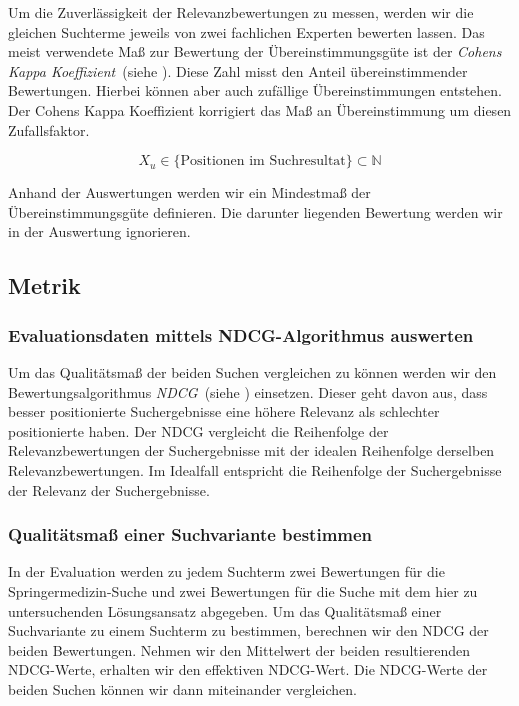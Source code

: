 Um die Zuverlässigkeit der Relevanzbewertungen zu messen, werden wir die gleichen Suchterme jeweils von zwei fachlichen Experten bewerten lassen. Das  meist verwendete  Maß  zur  Bewertung  der Übereinstimmungsgüte ist der \textit{Cohens Kappa Koeffizient}~(siehe \cite{Kappa}). Diese Zahl misst den  Anteil übereinstimmender Bewertungen. Hierbei können aber auch zufällige Übereinstimmungen entstehen. Der Cohens Kappa Koeffizient korrigiert das Maß an Übereinstimmung um diesen Zufallsfaktor. 

\begin{equation}	
	X_{u} \in \lbrace \text{Positionen im Suchresultat} \rbrace \subset \mathbb{N}
\end{equation}

Anhand der Auswertungen werden wir ein Mindestmaß der Übereinstimmungsgüte definieren. Die darunter liegenden Bewertung werden wir in der Auswertung ignorieren. 

\subsection{Metrik}
\label{sec:Evaluation:Aufbau:Metrik}

\subsubsection{Evaluationsdaten mittels NDCG-Algorithmus auswerten}
\label{sec:Evaluation:Aufbau:Metrik:EvaluationsdatenNDCG}

Um das Qualitätsmaß der beiden Suchen vergleichen zu können werden wir den Bewertungsalgorithmus \textit{NDCG}~(siehe \cite{NDCG}) einsetzen. Dieser geht davon aus, dass besser positionierte Suchergebnisse eine höhere Relevanz als schlechter positionierte haben. Der NDCG vergleicht die Reihenfolge der Relevanzbewertungen der Suchergebnisse mit der idealen Reihenfolge derselben Relevanzbewertungen. Im Idealfall entspricht die Reihenfolge der Suchergebnisse der Relevanz der Suchergebnisse.

\subsubsection{Qualitätsmaß einer Suchvariante bestimmen}
\label{sec:Evaluation:Aufbau:Metrik:QualitaetMessen}

In der Evaluation werden zu jedem Suchterm zwei Bewertungen für die Springermedizin-Suche und zwei Bewertungen für die Suche mit dem hier zu untersuchenden Lösungsansatz abgegeben. Um das Qualitätsmaß einer Suchvariante zu einem Suchterm zu bestimmen, berechnen wir den NDCG der beiden Bewertungen. Nehmen wir den Mittelwert der beiden resultierenden NDCG-Werte, erhalten wir den effektiven NDCG-Wert. Die NDCG-Werte der beiden Suchen können wir dann miteinander vergleichen.

